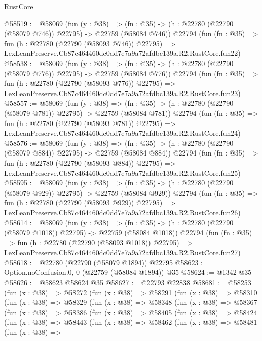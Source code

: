 \begin{lexlean}{RustCore}
\begin{coremodule}
@58519 := @58069
    (fun (y : @38) =>
    (fn : @35) -> (h : @22780 (@22790 (@58079 @746)) @22795) -> @22759 (@58084 @746))
    @22794
    (fun (fn : @35) =>
    fun (h : @22780 (@22790 (@58093 @746)) @22795) =>
    LexLeanPreserve.Cb87c464460dc0dd7e7a9a72afdbc139a.R2.RustCore.fun22)
@58538 := @58069
    (fun (y : @38) =>
    (fn : @35) -> (h : @22780 (@22790 (@58079 @776)) @22795) -> @22759 (@58084 @776))
    @22794
    (fun (fn : @35) =>
    fun (h : @22780 (@22790 (@58093 @776)) @22795) =>
    LexLeanPreserve.Cb87c464460dc0dd7e7a9a72afdbc139a.R2.RustCore.fun23)
@58557 := @58069
    (fun (y : @38) =>
    (fn : @35) -> (h : @22780 (@22790 (@58079 @781)) @22795) -> @22759 (@58084 @781))
    @22794
    (fun (fn : @35) =>
    fun (h : @22780 (@22790 (@58093 @781)) @22795) =>
    LexLeanPreserve.Cb87c464460dc0dd7e7a9a72afdbc139a.R2.RustCore.fun24)
@58576 := @58069
    (fun (y : @38) =>
    (fn : @35) -> (h : @22780 (@22790 (@58079 @884)) @22795) -> @22759 (@58084 @884))
    @22794
    (fun (fn : @35) =>
    fun (h : @22780 (@22790 (@58093 @884)) @22795) =>
    LexLeanPreserve.Cb87c464460dc0dd7e7a9a72afdbc139a.R2.RustCore.fun25)
@58595 := @58069
    (fun (y : @38) =>
    (fn : @35) -> (h : @22780 (@22790 (@58079 @929)) @22795) -> @22759 (@58084 @929))
    @22794
    (fun (fn : @35) =>
    fun (h : @22780 (@22790 (@58093 @929)) @22795) =>
    LexLeanPreserve.Cb87c464460dc0dd7e7a9a72afdbc139a.R2.RustCore.fun26)
@58614 := @58069
    (fun (y : @38) =>
    (fn : @35) -> (h : @22780 (@22790 (@58079 @1018)) @22795) -> @22759 (@58084 @1018))
    @22794
    (fun (fn : @35) =>
    fun (h : @22780 (@22790 (@58093 @1018)) @22795) =>
    LexLeanPreserve.Cb87c464460dc0dd7e7a9a72afdbc139a.R2.RustCore.fun27)
@58618 := @22780 (@22790 (@58079 @1894)) @22795
@58623 := Option.noConfusion.{0, 0} (@22759 (@58084 @1894)) @35
@58624 := @1342 @35
@58626 := @58623 @58624 @35
@58627 := @22793 @22838
@58681 := @58253
    (fun (x : @38) =>
    @58272
      (fun (x : @38) =>
      @58291
        (fun (x : @38) =>
        @58310
          (fun (x : @38) =>
          @58329
            (fun (x : @38) =>
            @58348
              (fun (x : @38) =>
              @58367
                (fun (x : @38) =>
                @58386
                  (fun (x : @38) =>
                  @58405
                    (fun (x : @38) =>
                    @58424
                      (fun (x : @38) =>
                      @58443
                        (fun (x : @38) =>
                        @58462
                          (fun (x : @38) =>
                          @58481
                            (fun (x : @38) =>

\end{coremodule}
\end{lexlean}
